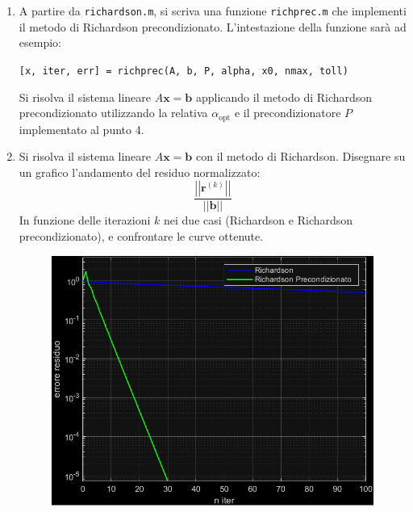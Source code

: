 \begin{enumerate}
    \item A partire da \texttt{richardson.m}, si scriva una funzione \texttt{richprec.m} che implementi il metodo di Richardson precondizionato. L'intestazione della funzione sarà ad esempio:
    \begin{center}
        \texttt{[x, iter, err] = richprec(A, b, P, alpha, x0, nmax, toll)}
    \end{center}
    Si risolva il sistema lineare $A\mathbf{x} = \mathbf{b}$ applicando il metodo di Richardson precondizionato utilizzando la relativa $\alpha_{\text{opt}}$ e il precondizionatore $P$ implementato al punto 4.
    
    

    \item Si risolva il sistema lineare $A\mathbf{x} = \mathbf{b}$ con il metodo di Richardson. Disegnare su un grafico l'andamento del residuo normalizzato:
    \begin{equation*}
        \dfrac{\left|\left| \mathbf{r}^{\left(k\right)} \right|\right|}{\left|\left| \mathbf{b} \right|\right|}
    \end{equation*}
    In funzione delle iterazioni $k$ nei due casi (Richardson e Richardson precondizionato), e confrontare le curve ottenute.
    
    \newpage
    \begin{figure}[!htp]
        \centering
        \includegraphics[width=.7\textwidth]{img/gradiente-3.pdf}
    \end{figure}
\end{enumerate}